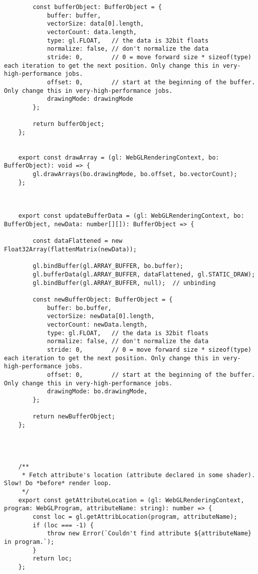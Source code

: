 {\begin{lstlisting}
        const bufferObject: BufferObject = {
            buffer: buffer,
            vectorSize: data[0].length,
            vectorCount: data.length,
            type: gl.FLOAT,   // the data is 32bit floats
            normalize: false, // don't normalize the data
            stride: 0,        // 0 = move forward size * sizeof(type) each iteration to get the next position. Only change this in very-high-performance jobs.
            offset: 0,        // start at the beginning of the buffer. Only change this in very-high-performance jobs.
            drawingMode: drawingMode
        };
    
        return bufferObject;
    };
    
    
    export const drawArray = (gl: WebGLRenderingContext, bo: BufferObject): void => {
        gl.drawArrays(bo.drawingMode, bo.offset, bo.vectorCount);
    };
    
    
    
    export const updateBufferData = (gl: WebGLRenderingContext, bo: BufferObject, newData: number[][]): BufferObject => {
    
        const dataFlattened = new Float32Array(flattenMatrix(newData));
    
        gl.bindBuffer(gl.ARRAY_BUFFER, bo.buffer);
        gl.bufferData(gl.ARRAY_BUFFER, dataFlattened, gl.STATIC_DRAW);
        gl.bindBuffer(gl.ARRAY_BUFFER, null);  // unbinding
    
        const newBufferObject: BufferObject = {
            buffer: bo.buffer,
            vectorSize: newData[0].length,
            vectorCount: newData.length,
            type: gl.FLOAT,   // the data is 32bit floats
            normalize: false, // don't normalize the data
            stride: 0,        // 0 = move forward size * sizeof(type) each iteration to get the next position. Only change this in very-high-performance jobs.
            offset: 0,        // start at the beginning of the buffer. Only change this in very-high-performance jobs.
            drawingMode: bo.drawingMode,
        };
    
        return newBufferObject;
    };
    
    
    
    
    /**
     * Fetch attribute's location (attribute declared in some shader). Slow! Do *before* render loop.
     */
    export const getAttributeLocation = (gl: WebGLRenderingContext, program: WebGLProgram, attributeName: string): number => {
        const loc = gl.getAttribLocation(program, attributeName);
        if (loc === -1) {
            throw new Error(`Couldn't find attribute ${attributeName} in program.`);
        }
        return loc;
    };
    

\end{lstlisting}}
